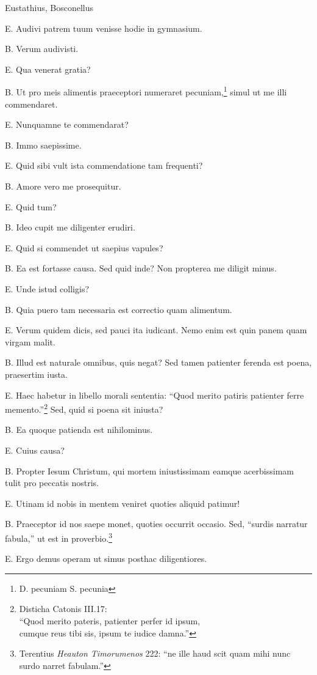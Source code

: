 \documentclass{article}
\begin{document}
Eustathius, Bosconellus

E. Audivi patrem tuum venisse hodie in gymnasium.
 
B. Verum audivisti.

E. Qua venerat gratia?

B. Ut pro meis alimentis praeceptori numeraret pecuniam,\footnote{D. pecuniam S. pecunia} simul ut me illi commendaret.

E. Nunquamne te commendarat?

B. Immo saepissime.

E. Quid sibi vult ista commendatione tam frequenti?

B. Amore vero me prosequitur.

E. Quid tum?

B. Ideo cupit me diligenter erudiri.

E. Quid si commendet ut saepius vapules?

B. Ea est fortasse causa. Sed quid inde? Non propterea me diligit minus.

E. Unde istud colligis?

B. Quia puero tam necessaria est correctio quam alimentum.

E. Verum quidem dicis, sed pauci ita iudicant. Nemo enim est quin panem quam virgam malit.

B. Illud est naturale omnibus, quis negat? Sed tamen patienter ferenda est poena, praesertim iusta.

E. Haec habetur in libello morali sententia: ``Quod merito patiris patienter ferre memento.''\footnote{Disticha Catonis III.17: \\``Quod merito pateris, patienter perfer id ipsum,
\\cumque reus tibi sis, ipsum te iudice damna.''} Sed, quid si poena sit iniusta?

B. Ea quoque patienda est nihilominus.

E. Cuius causa?

B. Propter Iesum Christum, qui mortem iniustissimam eamque acerbissimam tulit pro peccatis nostris.

E. Utinam id nobis in mentem veniret quoties aliquid patimur!

B. Praeceptor id nos saepe monet, quoties occurrit occasio. Sed, ``surdis narratur fabula,'' ut est in proverbio.\footnote{Terentius \emph{Heauton Timorumenos} 222: ``ne ille haud scit quam mihi nunc surdo narret fabulam.''}

E. Ergo demus operam ut simus posthac diligentiores.
\end{document}
